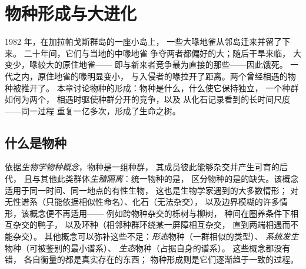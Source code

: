 \chapter{物种形成与大进化}\label{ch:b2:speciation}

1982 年，在加拉帕戈斯群岛的一座小岛上，
一些大喙地雀从邻岛迁来并留了下来。
二十年间，它们与当地的中喙地雀
争夺两者都偏好的大；随后干旱来临，
大变少，喙较大的原住地雀——
即与新来者竞争最为直接的那些——因此饿死。
一代之内，原住地雀的喙明显变小，
与入侵者的喙拉开了距离。两个曾经相遇的物种被推开了。
本章讨论物种的形成：物种是什么，什么使它保持独立，
一个种群如何为两个，
相遇时驱使种群分开的竞争，以及
从化石记录看到的长时间尺度——同一过程
重复一亿多次，形成了生命之树。

\section{什么是物种}

\begin{definition}[物种]\label{def:b2:speciation:species}
依据\emph{生物学物种概念}，物种是一组种群，
其成员彼此能够杂交并产生可育的后代，
且与其他此类群体\emph{生殖隔离}：统一物种的是，
区分物种的是的缺失。该概念适用于同一时间、同一地点的有性生物，
这也是生物学家遇到的大多数情形；
对无性谱系（只能依据相似性命名）、化石（无法杂交），
以及边界模糊的许多情形，该概念便不再适用——
例如跨物种杂交的栎树与柳树，
种间在圈养条件下相互杂交的鸭子，
以及环种（相邻种群环绕某一屏障相互杂交，
直到两端相遇而不能杂交）。
其他概念可以弥补这些不足：\emph{形态}物种（一群相似的类型）、
\emph{系统发生}物种（可被鉴别的最小谱系）、
\emph{生态}物种（占据自身的谱系）。
这些概念都没有错，
各自衡量的都是真实存在的东西；
物种形成则是它们逐渐趋于一致的过程。
\end{definition}

